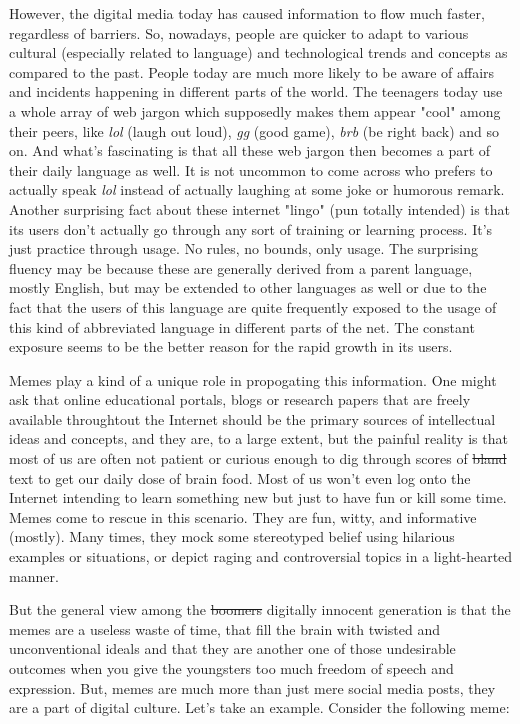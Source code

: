 \documentclass{article}
\begin{document}
    However, the digital media today has caused information to flow much faster, regardless of barriers. So, nowadays, people are quicker to adapt to various cultural (especially related to language) and technological trends and concepts as compared to the past. People today are much more likely to be aware of affairs and incidents happening in different parts of the world. The teenagers today use a whole array of web jargon which supposedly makes them appear "cool" among their peers, like \textit{lol} (laugh out loud), \textit{gg} (good game), \textit{brb} (be right back) and so on. And what's fascinating is that all these web jargon then becomes a part of their daily language as well. It is not uncommon to come across who prefers to actually speak \textit{lol} instead of actually laughing at some joke or humorous remark. Another surprising fact about these internet "lingo" (pun totally intended) is that its users don't actually go through any sort of training or learning process. It's just practice through usage. No rules, no bounds, only usage. The surprising fluency may be because these are generally derived from a parent language, mostly English, but may be extended to other languages as well or due to the fact that the users of this language are quite frequently exposed to the usage of this kind of abbreviated language in different parts of the net. The constant exposure seems to be the better reason for the rapid growth in its users. 
    
    Memes play a kind of a unique role in propogating this information. One might ask that online educational portals, blogs or research papers that are freely available throughtout the Internet should be the primary sources of intellectual ideas and concepts, and they are, to a large extent, but the painful reality is that most of us are often not patient or curious enough to dig through scores of \st{bland} text to get our daily dose of brain food. Most of us won't even log onto the Internet intending to learn something new but just to have fun or kill some time. Memes come to rescue in this scenario. They are fun, witty, and informative (mostly). Many times, they mock some stereotyped belief using hilarious examples or situations, or depict raging and controversial topics in a light-hearted manner. 

    But the general view among the \st{boomers} digitally innocent generation is that the memes are a useless waste of time, that fill the brain with twisted and unconventional ideals and that they are another one of those undesirable outcomes when you give the youngsters too much freedom of speech and expression. But, memes are much more than just mere social media posts, they are a part of digital culture. Let's take an example. Consider the following meme:
\end{document}

